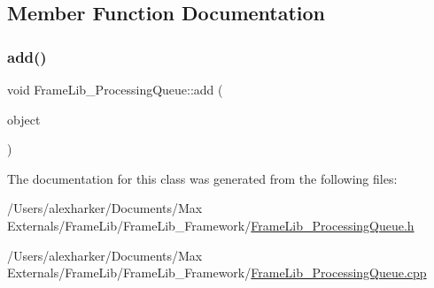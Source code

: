 \subsection{Member Function Documentation}
\mbox{\label{class_frame_lib___processing_queue_add4ce0ad0a1cc32eb2df5522adea7e62}} 
\subsubsection{\texorpdfstring{add()}{add()}}
{\footnotesize\ttfamily void Frame\+Lib\+\_\+\+Processing\+Queue\+::add (\begin{DoxyParamCaption}\item[{\hyperlink{class_frame_lib___d_s_p}{Frame\+Lib\+\_\+\+D\+SP} $\ast$}]{object }\end{DoxyParamCaption})}



The documentation for this class was generated from the following files\+:\begin{DoxyCompactItemize}
\item 
/\+Users/alexharker/\+Documents/\+Max Externals/\+Frame\+Lib/\+Frame\+Lib\+\_\+\+Framework/\hyperlink{_frame_lib___processing_queue_8h}{Frame\+Lib\+\_\+\+Processing\+Queue.\+h}\item 
/\+Users/alexharker/\+Documents/\+Max Externals/\+Frame\+Lib/\+Frame\+Lib\+\_\+\+Framework/\hyperlink{_frame_lib___processing_queue_8cpp}{Frame\+Lib\+\_\+\+Processing\+Queue.\+cpp}\end{DoxyCompactItemize}
